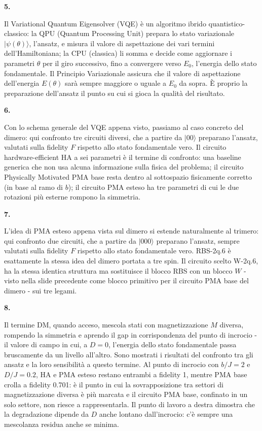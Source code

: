\documentclass[12pt,a4paper]{article}
\newcommand{\slidenum}[1]{%
  \par\vspace{0.55cm}
  {\bfseries\large #1.}\quad
}
\begin{document}
\slidenum{5}
Il Variational Quantum Eigensolver (VQE) è un algoritmo ibrido quantistico-classico: la QPU (Quantum Processing Unit) prepara lo stato variazionale $|\psi(\theta)\rangle$, l'ansatz, e misura il valore di aspettazione dei vari termini dell'Hamiltoniana; la CPU (classica) li somma e decide come aggiornare i parametri $\theta$ per il giro successivo, fino a convergere verso $E_0$, l'energia dello stato fondamentale. Il Principio Variazionale assicura che il valore di aspettazione dell'energia $E(\theta)$ sarà sempre maggiore o uguale a $E_0$ da sopra. È proprio la preparazione dell'ansatz il punto su cui si gioca la qualità del risultato.

\slidenum{6}
Con lo schema generale del VQE appena visto, passiamo al caso concreto del dimero: qui confronto tre circuiti diversi, che a partire da $|00\rangle$ preparano l'ansatz, valutati sulla fidelity $F$ rispetto allo stato fondamentale vero. Il circuito hardware-efficient HA a sei parametri è il termine di confronto: una baseline generica che non usa alcuna informazione sulla fisica del problema; il circuito Physically Motivated PMA base resta dentro al sottospazio fisicamente corretto (in base al ramo di $b$); il circuito PMA esteso ha tre parametri di cui le due rotazioni più esterne rompono la simmetria.

\slidenum{7}
L'idea di PMA esteso appena vista sul dimero si estende naturalmente al trimero: qui confronto due circuiti, che a partire da $|000\rangle$ preparano l'ansatz, sempre valutati sulla fidelity $F$ rispetto allo stato fondamentale vero. RBS-2q.6 è esattamente la stessa idea del dimero portata a tre spin. Il circuito scelto W-2q.6, ha la stessa identica struttura ma sostituisce il blocco RBS con un blocco $W$ - visto nella slide precedente come blocco primitivo per il circuito PMA base del dimero - sui tre legami.

\slidenum{8}
Il termine DM, quando acceso, mescola stati con magnetizzazione $M$ diversa, rompendo la simmetria e aprendo il gap in corrispondenza del punto di incrocio - il valore di campo in cui, a $D=0$, l'energia dello stato fondamentale passa bruscamente da un livello all'altro. Sono mostrati i risultati del confronto tra gli ansatz e la loro sensibilità a questo termine. Al punto di incrocio con $b/J = 2$ e $D/J = 0.2$, HA e PMA esteso restano entrambi a fidelity 1, mentre PMA base crolla a fidelity 0.701: è il punto in cui la sovrapposizione tra settori di magnetizzazione diversa è più marcata e il circuito PMA base, confinato in un solo settore, non riesce a rappresentarla. Il punto di lavoro a destra dimostra che la degradazione dipende da $D$ anche lontano dall'incrocio: c'è sempre una mescolanza residua anche se minima.
\end{document}
